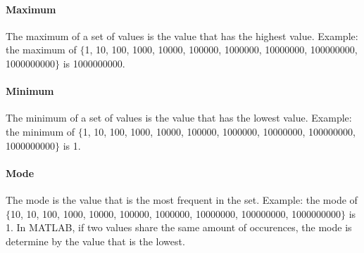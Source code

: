 \documentclass[a4paper,12pt]{article}
\begin{document}
\paragraph{Maximum} The maximum of a set of values is the value that has the highest value. Example: the maximum of $\{$1, 10, 100, 1000, 10000, 100000, 1000000, 10000000, 100000000, 1000000000$\}$ is 1000000000.

\paragraph{Minimum} The minimum of a set of values is the value that has the lowest value. Example: the minimum of $\{$1, 10, 100, 1000, 10000, 100000, 1000000, 10000000, 100000000, 1000000000$\}$ is 1.

\paragraph{Mode} The mode is the value that is the most frequent in the set. Example: the mode of $\{$10, 10, 100, 1000, 10000, 100000, 1000000, 10000000, 100000000, 1000000000$\}$ is 1. In MATLAB, if two values share the same amount of occurences, the mode is determine by the value that is the lowest. 


\newpage



 
\end{document}
